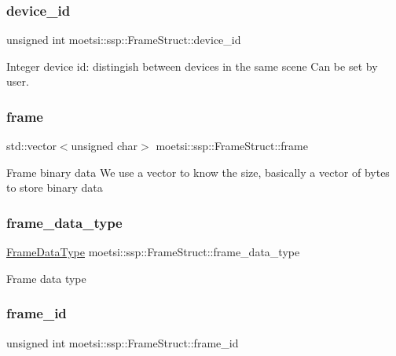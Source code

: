 \subsubsection{\texorpdfstring{device\+\_\+id}{device\_id}}
{\footnotesize\ttfamily unsigned int moetsi\+::ssp\+::\+Frame\+Struct\+::device\+\_\+id}

Integer device id\+: distingish between devices in the same scene Can be set by user. \mbox{\label{structmoetsi_1_1ssp_1_1FrameStruct_aded4a3fb94bc5aec4844cc9643b6a020}} 
\subsubsection{\texorpdfstring{frame}{frame}}
{\footnotesize\ttfamily std\+::vector$<$unsigned char$>$ moetsi\+::ssp\+::\+Frame\+Struct\+::frame}

Frame binary data We use a vector to know the size, basically a vector of bytes to store binary data \mbox{\label{structmoetsi_1_1ssp_1_1FrameStruct_a281ef582bcbb8b6b3d0f0eb3efd615c6}} 
\subsubsection{\texorpdfstring{frame\+\_\+data\+\_\+type}{frame\_data\_type}}
{\footnotesize\ttfamily \hyperlink{namespacemoetsi_1_1ssp_aa9b059f0bc7a91855545ee887f2d56c4}{Frame\+Data\+Type} moetsi\+::ssp\+::\+Frame\+Struct\+::frame\+\_\+data\+\_\+type}

Frame data type \mbox{\label{structmoetsi_1_1ssp_1_1FrameStruct_aebc84f95b5024225412d92a56ddf24ad}} 
\subsubsection{\texorpdfstring{frame\+\_\+id}{frame\_id}}
{\footnotesize\ttfamily unsigned int moetsi\+::ssp\+::\+Frame\+Struct\+::frame\+\_\+id}

